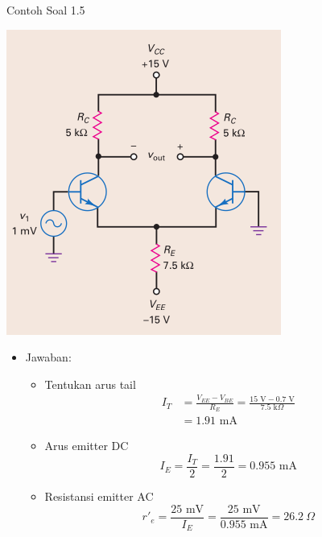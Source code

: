 \documentclass[aspectratio=169]{beamer}
\begin{document}
\begin{frame}{Contoh Soal 1.5}
	\begin{multicols}{2}
		\begin{center}
			\includegraphics[height=0.7\textheight]{gambar/01.contoh_soal_1-2}
		\end{center}
		\columnbreak
		\begin{itemize}
			\item Jawaban:
			\begin{itemize}
				\item Tentukan arus tail
				\begin{align*}
					I_T &= \frac{V_{EE} - V_{BE}}{R_E} = \frac{15 \text{ V} - 0.7 \text{ V}}{7.5 \text{ k}\Omega} \\
					&= 1.91 \text{ mA}
				\end{align*}
				\item Arus emitter DC
				\[ I_E = \frac{I_T}{2} = \frac{1.91}{2} = 0.955 \text{ mA}\]
				\item Resistansi emitter AC
				\[ r'_e = \frac{25 \text{ mV}}{ I_E} =\frac{25 \text{ mV}}{0.955 \text{ mA}} = 26.2~\Omega \]
			\end{itemize}
		\end{itemize}
	\end{multicols}
\end{frame}
\end{document}
